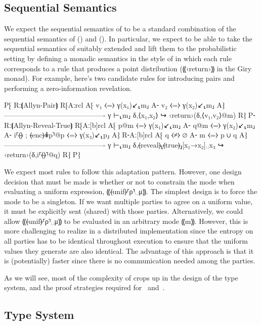 \subsection{Sequential Semantics}
\label{subsec:proposal-design-seq}

We expect the sequential semantics of \lang to be a standard combination of the sequential
semantics of \mpc () and \obliv (). In particular, we
expect to be able to take the sequential semantics of \mpc suitably extended and lift them
to the probabilistic setting by defining a monadic semantics in the style of \obliv in which
each \mpc rule corresponds to a \lang rule that produces a point distribution (⸨‹return›⸩ in
the Giry monad). For example, here's two candidate rules for introducing pairs and performing
a zero-information revelation.

P⁅ Rː⦗Allyn-Pair⦘
   R⁅{Aːrcl
      A⁅ v₁ ⧼=⧽ γ(x₁)↙⸤m⸥
      A⁃ v₂ ⧼=⧽ γ(x₂)↙⸤m⸥
      A⁆}
      -------------------------------------------
      γ ⊢⸤m⸥ δ,⟨x₁,x₂⟩ ↪ ‹return›(δ,⟨v₁,v₂⟩@m)
      R⁆
P⁃ Rː⦗Allyn-Reveal-True⦘
   R⁅{Aː[b]rcl
      A⁅ p@m          ⧼=⧽ γ(x₁)↙⸤m⸥
      A⁃ q@m          ⧼=⧽ γ(x₂)↙⸤m⸥
      A⁃ i⸢⦑\faThumbsUp⦒ ; ⦑enc⦒⋕p⸣@p ⧼=⧽ γ(x₃)↙⸤p⸥
      A⁆}
   R⁃{Aː[b]rcl
      A⁅ q ⧼≠⧽ ∅
      A⁃ m ⧼=⧽ p ∪ q
      A⁆}
      -------------------------------------------
      γ ⊢⸤m⸥ δ,⦑reveal⦒⸤⦑true⦒⸥[x₁→x₂]␣x₃ ↪ ‹return›(δ,i⸢⦑\faThumbsDown⦒⸣@q)
   R⁆
P⁆

We expect most rules to follow this adaptation pattern. However, one design decision
that must be made is whether or not to constrain the mode when evaluating a uniform
expression, ⸨⦑unif⦒⸢ρ⸣␣μ⸩. The simplest design is to force the mode to be a singleton.
If we want multiple parties to agree on a uniform value, it must be explicitly sent (shared)
with those parties. Alternatively, we could allow ⸨⦑unif⦒⸢ρ⸣␣μ⸩ to be evaluated in an arbitrary
mode ⸨m⸩. However, this is more challenging to realize in a distributed implementation since the
entropy on all parties has to be identical throughout execution to ensure that the uniform values
they generate are also identical. The advantage of this approach is that it is (potentially) faster
since there is no communication needed among the parties.

As we will see, most of the complexity of \lang crops up in the design of the type system, and the
proof strategies required for~ and~.

\subsection{Type System}
\label{subsec:proposal-design-types}


